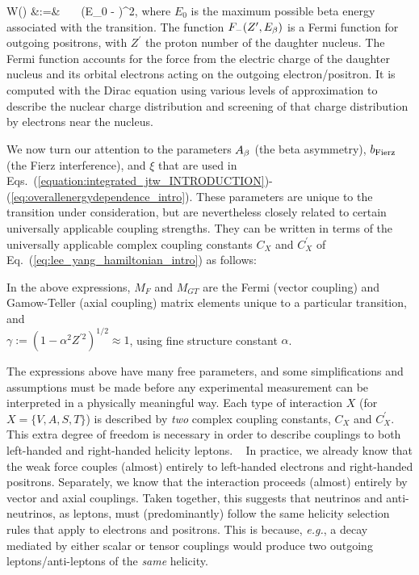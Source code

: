 \bea
W(\Ebeta) &:=&  \, \FFminus \, \xi \, \pe \Ee (E_0 - \Ee)^2,
\label{eq:overallenergydependence_intro}
\eea
where $E_0$ is the maximum possible beta energy associated with the transition.  The function $F_{-}(Z^\prime, E_\beta)$ is a Fermi function for outgoing positrons,
with $Z^\prime$ the proton number of the daughter nucleus.  The Fermi function accounts for the force from the electric charge of the daughter nucleus and its orbital electrons acting on the outgoing electron/positron.  It is computed with the Dirac equation using various levels of approximation to describe the nuclear charge distribution and screening of that charge distribution by electrons near the nucleus.

We now turn our attention to the parameters $A_{\beta}$ (the beta asymmetry), $b_{\mathrm{Fierz}}$ (the Fierz interference), and $\xi$ that are used in Eqs.~(\ref{equation:integrated_jtw_INTRODUCTION})-(\ref{eq:overallenergydependence_intro}).  These parameters are unique to the transition under consideration, but are nevertheless closely related to certain universally applicable coupling strengths.  They can be written in terms of the universally applicable complex coupling constants $C_X$ and $C_X^{\prime}$ of Eq.~(\ref{eq:lee_yang_hamiltonian_intro})
as follows: 


In the above expressions, $M_F$ and $M_{GT}$ are the Fermi (vector coupling) and Gamow-Teller (axial coupling) matrix elements unique to a particular transition,~ and 
\\
\mbox{$\gamma := \left( 1-\alpha^2 Z^{\prime 2} \right)^{1/2} \approx 1$}, using fine structure constant $\alpha$.

The expressions above have many free parameters, and some simplifications and assumptions must be made before any experimental measurement can be interpreted in a physically meaningful way.  
Each type of interaction $X$ (for $X=\{V,A,S,T\}$) is described by \emph{two} complex coupling constants, $C_X$ and $C_X^\prime$.  This extra degree of freedom is necessary in order to describe couplings to both left-handed and right-handed helicity leptons.
~
In practice, we already know that the weak force couples (almost) entirely to left-handed electrons and right-handed positrons.  Separately, we know that the interaction proceeds (almost) entirely by vector and axial couplings.  Taken together, this suggests that neutrinos and anti-neutrinos, as leptons, must (predominantly) follow the same helicity selection rules that apply to electrons and positrons.  This is because, \emph{e.g.}, a decay mediated by either scalar or tensor couplings would produce two outgoing leptons/anti-leptons of the \emph{same} helicity.  

